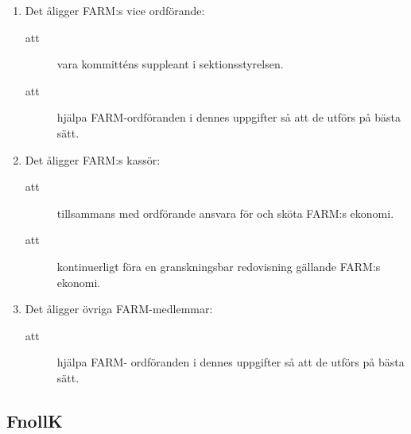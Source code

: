 \documentclass[11pt,a4paper]{article}
\begin{document}
\begin{enumerate}[\thesubsection .1]
  \item Det åligger FARM:s vice ordförande:
    \begin{description}
      \item[att] vara kommitténs suppleant i sektionsstyrelsen.
      \item[att] hjälpa FARM-ordföranden i dennes uppgifter så att de utförs på bästa sätt.
    \end{description}

  \item Det åligger FARM:s kassör:
    \begin{description}
      \item[att] tillsammans med ordförande ansvara för och sköta FARM:s ekonomi.
      \item[att] kontinuerligt föra en granskningsbar redovisning gällande FARM:s ekonomi.
    \end{description}

  \item Det åligger övriga FARM-medlemmar:
    \begin{description}
      \item[att] hjälpa FARM- ordföranden i dennes uppgifter så att de utförs på bästa sätt.
    \end{description}

\end{enumerate}


\subsection{FnollK}
\end{document}
